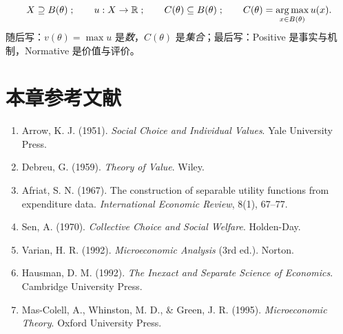\[
X\supseteq B(\theta)\;;\qquad
u:X\to\mathbb{R}\;;\qquad
C(\theta)\subseteq B(\theta)\;;\qquad
C(\theta)=\operatorname*{arg\,max}_{x\in B(\theta)} u(x).
\]
随后写：$v(\theta)=\max u$ 是\emph{数}，$C(\theta)$ 是\emph{集合}；最后写：Positive 是事实与机制，Normative 是价值与评价。

\clearpage
\tableofcontents
\clearpage



















\clearpage
\section*{本章参考文献}
\begin{enumerate}
  \item Arrow, K. J. (1951). \emph{Social Choice and Individual Values}. Yale University Press.
  \item Debreu, G. (1959). \emph{Theory of Value}. Wiley.
  \item Afriat, S. N. (1967). The construction of separable utility functions from expenditure data. \emph{International Economic Review}, 8(1), 67–77.
  \item Sen, A. (1970). \emph{Collective Choice and Social Welfare}. Holden-Day.
  \item Varian, H. R. (1992). \emph{Microeconomic Analysis} (3rd ed.). Norton.
  \item Hausman, D. M. (1992). \emph{The Inexact and Separate Science of Economics}. Cambridge University Press.
  \item Mas-Colell, A., Whinston, M. D., \& Green, J. R. (1995). \emph{Microeconomic Theory}. Oxford University Press.
\end{enumerate}


